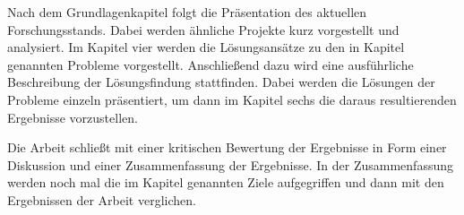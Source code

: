Nach dem Grundlagenkapitel folgt die Präsentation des aktuellen Forschungsstands. Dabei werden ähnliche Projekte kurz vorgestellt und analysiert. Im Kapitel vier werden die Lösungsansätze zu den in Kapitel  genannten Probleme vorgestellt. Anschließend dazu wird eine ausführliche Beschreibung der Lösungsfindung stattfinden. Dabei werden die Lösungen der Probleme einzeln präsentiert, um dann im Kapitel sechs die daraus resultierenden Ergebnisse vorzustellen.

Die Arbeit schließt mit einer kritischen Bewertung der Ergebnisse in Form einer Diskussion und einer Zusammenfassung der Ergebnisse. In der Zusammenfassung werden noch mal die im Kapitel  genannten Ziele aufgegriffen und dann mit den Ergebnissen der Arbeit verglichen.


